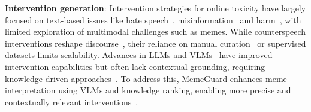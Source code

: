 \textbf{Intervention generation}: Intervention strategies for online toxicity have largely focused on text-based issues like hate speech~\cite{qian-etal-2019-benchmark, jha2024memeguardllmvlmbasedframework}, misinformation~\cite{10.1145/3543507.3583388} and harm~\cite{banerjee2024safeinfercontextadaptivedecoding, hazra2024safetyarithmeticframeworktesttime, banerjee2025navigatingculturalkaleidoscopehitchhikers}, with limited exploration of multimodal challenges such as memes. While counterspeech interventions reshape discourse~\cite{SchiebGoverningHS}, their reliance on manual curation~\cite{mathew2018analyzinghatecounterspeech} or supervised datasets limits scalability. Advances in LLMs and VLMs~\cite{ghosh2024exploringfrontiervisionlanguagemodels} have improved intervention capabilities but often lack contextual grounding, requiring knowledge-driven approaches~\cite{dong2024surveyincontextlearning}. To address this, MemeGuard enhances meme interpretation using VLMs and knowledge ranking, enabling more precise and contextually relevant interventions~\cite{jha2024memeguardllmvlmbasedframework}.